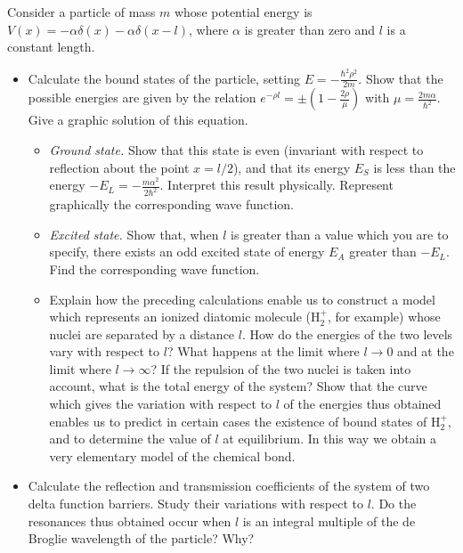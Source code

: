 \documentclass[12pt,a4paper]{article}
\newenvironment{problem}[2][Problem]{\begin{trivlist}
\item[\hskip \labelsep {\bfseries #1}\hskip \labelsep {\bfseries #2.}]}{\end{trivlist}}
\begin{document}
\begin{problem}{5}
[C-T Exercise 1-5] Consider a particle of mass $m$ whose potential energy is $V(x)=-\alpha\delta(x)-\alpha\delta(x-l)$, where $\alpha$ is greater than zero and $l$ is a constant length.
\begin{itemize}
\item[(a)] Calculate the bound states of the particle, setting $E=-\frac{\hbar^2\rho^2}{2m}$. Show that the possible energies are given by the relation $e^{-\rho l}=\pm\left(1-\frac{2\rho}{\mu}\right)$ with $\mu=\frac{2m\alpha}{\hbar^2}$. Give a graphic solution of this equation.
\begin{itemize}
\item[i.] \textit{Ground state.} Show that this state is even (invariant with respect to reflection about the point $x=l/2$), and that its energy $E_S$ is less than the energy $-E_L=-\frac{m\alpha^2}{2\hbar^2}$. Interpret this result physically. Represent graphically the corresponding wave function.
\item[ii.] \textit{Excited state.} Show that, when $l$ is greater than a value which you are to specify, there exists an odd excited state of energy $E_A$ greater than $-E_L$. Find the corresponding wave function.
\item[iii.] Explain how the preceding calculations enable us to construct a model which represents an ionized diatomic molecule (H$_2^+$, for example) whose nuclei are separated by a distance $l$.  How do the energies of the two levels vary with respect to $l$? What happens at the limit where $l\rightarrow0$ and at the limit where $l\rightarrow\infty$? If the repulsion of the two nuclei is taken into account, what is the total energy of the system? Show that the curve which gives the variation with respect to $l$  of the energies thus obtained enables us to predict in certain cases the existence of bound states of H$_2^+$, and to determine the value
of $l$ at equilibrium. In this way we obtain a very elementary model of the chemical bond.
\end{itemize}
\item[(b)] Calculate the reflection and transmission coefficients of the system of two delta function barriers. Study their variations with respect to $l$. Do the resonances thus obtained occur when $l$ is an integral multiple of the de Broglie wavelength of the particle? Why?
\end{itemize}
\end{problem}
\end{document}
